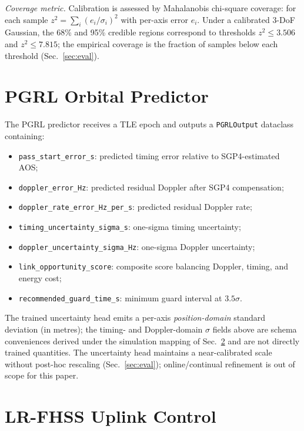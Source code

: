 \documentclass[conference]{IEEEtran}
\begin{document}
\emph{Coverage metric.} Calibration is assessed by Mahalanobis chi-square coverage: for each sample $z^2=\sum_i (e_i/\sigma_i)^2$ with per-axis error $e_i$. Under a calibrated $3$-DoF Gaussian, the 68\% and 95\% credible regions correspond to thresholds $z^2\le 3.506$ and $z^2\le 7.815$; the empirical coverage is the fraction of samples below each threshold (Sec.~\ref{sec:eval}).

\section{PGRL Orbital Predictor}
\label{sec:pgrl}

The PGRL predictor receives a TLE epoch and outputs a \texttt{PGRLOutput} dataclass containing:
\begin{itemize}
  \item \texttt{pass\_start\_error\_s}: predicted timing error relative to SGP4-estimated AOS;
  \item \texttt{doppler\_error\_Hz}: predicted residual Doppler after SGP4 compensation;
  \item \texttt{doppler\_rate\_error\_Hz\_per\_s}: predicted residual Doppler rate;
  \item \texttt{timing\_uncertainty\_sigma\_s}: one-sigma timing uncertainty;
  \item \texttt{doppler\_uncertainty\_sigma\_Hz}: one-sigma Doppler uncertainty;
  \item \texttt{link\_opportunity\_score}: composite score balancing Doppler, timing, and energy cost;
  \item \texttt{recommended\_guard\_time\_s}: minimum guard interval at $3.5\sigma$.
\end{itemize}

The trained uncertainty head emits a per-axis \emph{position-domain} standard deviation (in metres); the timing- and Doppler-domain $\sigma$ fields above are schema conveniences derived under the simulation mapping of Sec.~\ref{sec:uplink} and are not directly trained quantities. The uncertainty head maintains a near-calibrated scale without post-hoc rescaling (Sec.~\ref{sec:eval}); online/continual refinement is out of scope for this paper.

\section{LR-FHSS Uplink Control}
\label{sec:uplink}
\end{document}
